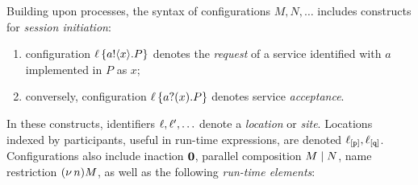\documentclass[runningheads]{llncs}
\begin{document}
Building upon processes, the syntax of configurations $M, N, \ldots$ includes constructs for \emph{session initiation}: 
\begin{enumerate}[$\bullet$]
\item configuration $\ell\left\{a ! \langle x \rangle .{P}\right\}$ denotes the \emph{request} of a service identified with $a$ implemented in 
$P$ as $x$; 
\item conversely, configuration 
$\ell\left\{a ? (x) .{P}\right\}$
denotes service \emph{acceptance}. 
\end{enumerate}
In these constructs,  identifiers $\ell, \ell', \ldots$ denote    a  \emph{location} 
or  \emph{site}. %
Locations indexed by participants, useful in run-time expressions, are denoted $\ell_{[\mathtt{p}]}, \ell_{[\mathtt{q}]}$.
Configurations also include
inaction $\mathbf{0}$, parallel composition  $M \;|\; N$,
name restriction $(\nu\, n) M$, as well as
 the following \emph{run-time elements}: %
 
\end{document}
